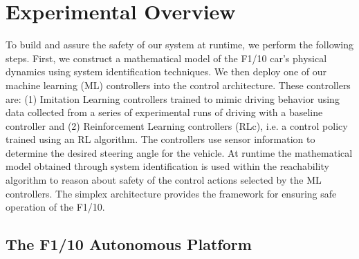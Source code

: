 \documentclass[manuscript,screen,review]{acmart}
\begin{document}
\section{Experimental Overview}

To build and assure the safety of our system at runtime, we perform the following steps. First, we construct a mathematical model of the F1/10 car's physical dynamics using system identification techniques. We then deploy one of our machine learning (ML) controllers into the control architecture. These controllers are: (1) Imitation Learning controllers trained to mimic driving behavior using data collected from a series of experimental runs of driving with a baseline controller and (2) Reinforcement Learning controllers (RLc), i.e. a control policy trained using an RL algorithm. The controllers use sensor information to determine the desired steering angle for the vehicle. At runtime the mathematical model obtained through system identification is used within the reachability algorithm to reason about safety of the control actions selected by the ML controllers. The simplex architecture provides the framework for ensuring safe operation of the F1/10.



\subsection{The F1/10 Autonomous Platform}
\end{document}
